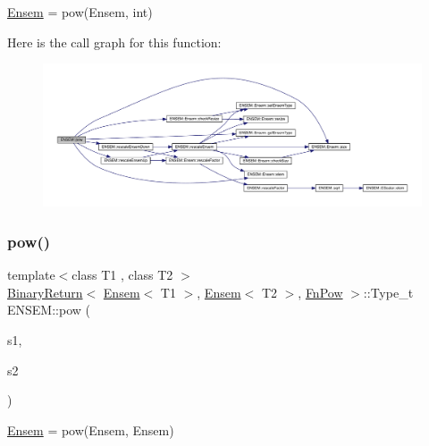 \mbox{\hyperlink{classENSEM_1_1Ensem}{Ensem}} = pow(\+Ensem, int) 

Here is the call graph for this function\+:\nopagebreak
\begin{figure}[H]
\begin{center}
\leavevmode
\includegraphics[width=350pt]{d1/d9e/group__eensem_ga038873ee1f1a6dfb9540558711f11110_cgraph}
\end{center}
\end{figure}
\mbox{\label{group__eensem_ga08a0a61df39df2d4038eed616fcfa56b}} 
\subsubsection{\texorpdfstring{pow()}{pow()}\hspace{0.1cm}{\footnotesize\ttfamily [2/4]}}
{\footnotesize\ttfamily template$<$class T1 , class T2 $>$ \\
\mbox{\hyperlink{structENSEM_1_1BinaryReturn}{Binary\+Return}}$<$ \mbox{\hyperlink{classENSEM_1_1Ensem}{Ensem}}$<$ T1 $>$, \mbox{\hyperlink{classENSEM_1_1Ensem}{Ensem}}$<$ T2 $>$, \mbox{\hyperlink{structENSEM_1_1FnPow}{Fn\+Pow}} $>$\+::Type\+\_\+t E\+N\+S\+E\+M\+::pow (\begin{DoxyParamCaption}\item[{const \mbox{\hyperlink{classENSEM_1_1Ensem}{Ensem}}$<$ T1 $>$ \&}]{s1,  }\item[{const \mbox{\hyperlink{classENSEM_1_1Ensem}{Ensem}}$<$ T2 $>$ \&}]{s2 }\end{DoxyParamCaption})\hspace{0.3cm}{\ttfamily [inline]}}



\mbox{\hyperlink{classENSEM_1_1Ensem}{Ensem}} = pow(\+Ensem, Ensem) 

